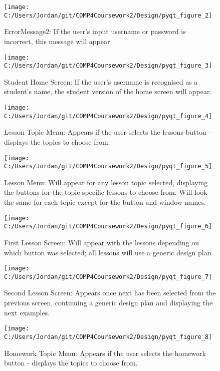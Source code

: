 \begin{figure}[H]
    \label{fig:print_function_result}\caption{ErrorMessage2: If the user's input username or password is incorrect, this message will appear.}
    \texttt{[image: C:/Users/Jordan/git/COMP4Coursework2/Design/pyqt\_figure\_2]}
\end{figure}

\begin{figure}[H]
    \label{fig:print_function_result}\caption{Student Home Screen: If the user's username is recognised as a student's name, the student version of the home screen will appear.}
    \texttt{[image: C:/Users/Jordan/git/COMP4Coursework2/Design/pyqt\_figure\_3]}
\end{figure}

\begin{figure}[H]
    \label{fig:print_function_result}\caption{Lesson Topic Menu: Appears if the user selects the lessons button - displays the topics to choose from.}
    \texttt{[image: C:/Users/Jordan/git/COMP4Coursework2/Design/pyqt\_figure\_4]}
\end{figure}

\begin{figure}[H]
    \label{fig:print_function_result}\caption{Lesson Menu: Will appear for any lesson topic selected, displaying the buttons for the topic specific lessons to choose from. Will look the same for each topic except for the button and window names.}
    \texttt{[image: C:/Users/Jordan/git/COMP4Coursework2/Design/pyqt\_figure\_5]}
\end{figure}

\begin{figure}[H]
    \label{fig:print_function_result}\caption{First Lesson Screen: Will appear with the lessons depending on which button was selected; all lessons will use a generic design plan.}
    \texttt{[image: C:/Users/Jordan/git/COMP4Coursework2/Design/pyqt\_figure\_6]}
\end{figure}

\begin{figure}[H]
    \label{fig:print_function_result}\caption{Second Lesson Screen: Appears once next has been selected from the previous screen, continuing a generic design plan and displaying the next examples.}
    \texttt{[image: C:/Users/Jordan/git/COMP4Coursework2/Design/pyqt\_figure\_7]}
\end{figure}

\begin{figure}[H]
    \label{fig:print_function_result}\caption{Homework Topic Menu: Appears if the user selects the homework button - displays the topics to choose from.}
    \texttt{[image: C:/Users/Jordan/git/COMP4Coursework2/Design/pyqt\_figure\_8]}
\end{figure}

